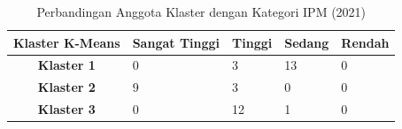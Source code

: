\begin{table}[H]
\centering
\caption{Perbandingan Anggota Klaster dengan Kategori IPM (2021)} \label{tab:ipm_cross_2021}
\begin{tabular}{|c|p{2cm}|p{2cm}|p{2cm}|p{2cm}|}
\hline
\textbf{Klaster K-Means} & \textbf{Sangat Tinggi} & \textbf{Tinggi} & \textbf{Sedang} & \textbf{Rendah} \\ \hline
\textbf{Klaster 1} & 0 & 3 & 13 & 0 \\ \hline
\textbf{Klaster 2} & 9 & 3 & 0 & 0 \\ \hline
\textbf{Klaster 3} & 0 & 12 & 1 & 0 \\ \hline
\end{tabular}
\end{table}